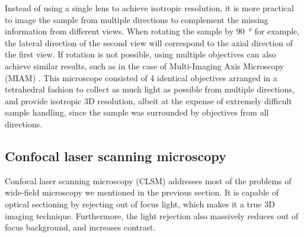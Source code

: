   Instead of using a single lens to achieve isotropic resolution, it is more practical to image the sample from multiple directions to complement the missing information from different views. When rotating the sample by \SI{90}{\degree} for example, the lateral direction of the second view will correspond to the axial direction of the first view. If rotation is not possible, using multiple objectives can also achieve similar results, such as in the case of Multi-Imaging Axis Microscopy (MIAM) \cite{swoger_multiple_2003,swoger_multi-view_2007}. This microscope consisted of 4 identical objectives arranged in a tetrahedral fashion to collect as much light as possible from multiple directions, and provide isotropic 3D resolution, albeit at the expense of extremely difficult sample handling, since the sample was surrounded by objectives from all directions. 






                                                              

  \subsection{Confocal laser scanning microscopy}

    Confocal laser scanning microscopy (CLSM) \cite{minsky_microscopy_1961,davidovits_scanning_1969} addresses most of the problems of wide-field microscopy we mentioned in the previous section. It is capable of optical sectioning by rejecting out of focus light, which makes it a
    true %
    3D imaging technique. Furthermore, the light rejection also massively reduces out of focus background, and increases contrast.

